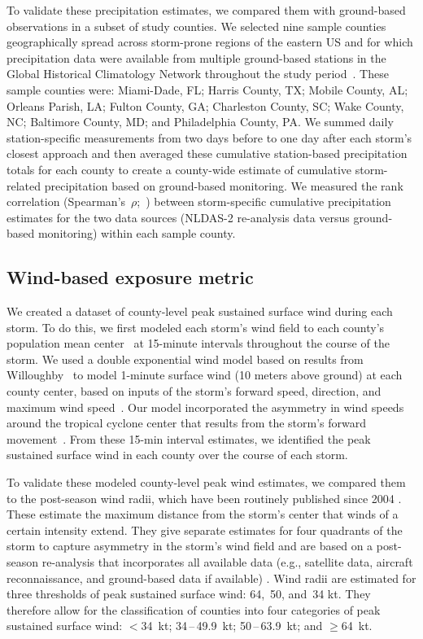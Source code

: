 To validate these precipitation estimates, we compared them with ground-based
observations in a subset of study counties. We selected nine sample counties
geographically spread across storm-prone regions of the eastern \ac{US} and for
which precipitation data were available from multiple ground-based stations
in the Global Historical Climatology Network throughout the study
period~\parencite{menne2012overview, rnoaa, countyweather}. These sample
counties were: Miami-Dade, FL; Harris County, TX; Mobile County, AL; Orleans
Parish, LA; Fulton County, GA; Charleston County, SC; Wake County, NC;
Baltimore County, MD; and Philadelphia County, PA. We summed daily
station-specific measurements from two days before to one day after each
storm's closest approach and then averaged these cumulative station-based
precipitation totals for each county to create a county-wide estimate of
cumulative storm-related precipitation based on ground-based monitoring. We
measured the rank correlation (Spearman's~$\rho$;~\textcite{spearman1904proof})
between storm-specific cumulative precipitation estimates for the two data
sources (\ac{NLDAS-2} re-analysis data versus ground-based monitoring) within
each sample county.

\subsection*{Wind-based exposure metric}

We created a dataset of county-level peak sustained surface wind during each
storm. To do this, we first modeled each storm's wind field to each county's
population mean center~\parencite{countycenters} at 15-minute intervals
throughout the course of the storm. We used a double exponential wind model
based on results from Willoughby~\parencite{willoughby2006parametric} to model
1-minute surface wind (10 meters above ground) at each county center, based on
inputs of the storm's forward speed, direction, and maximum wind
speed~\parencite{stormwindmodel}.  Our model incorporated the asymmetry in wind
speeds around the tropical cyclone center that results from the storm's forward
movement~\parencite{phadke2003modeling}.  From these 15-\si{\minute} interval
estimates, we identified the peak sustained surface wind in each county over
the course of each storm.

To validate these modeled county-level peak wind estimates, we compared them
to the  post-season wind radii, which have been routinely published
since 2004 \parencite{knaff2016using}. These estimate the maximum
distance from the storm's center that winds of a certain intensity extend. They
give separate estimates for four quadrants of the storm to capture asymmetry in
the storm's wind field and are based on a post-season re-analysis that
incorporates all available data (e.g., satellite data, aircraft reconnaissance, and
ground-based data if available) \parencite{knaff2016using}. Wind radii are
estimated for three thresholds of peak sustained surface wind: 64,~50, and~34
kt.  They therefore allow for the classification of counties into four
categories of peak sustained surface wind: $<$34~kt; 34\,--\,49.9~kt;
50\,--\,63.9~kt; and $\ge$64~kt. 

